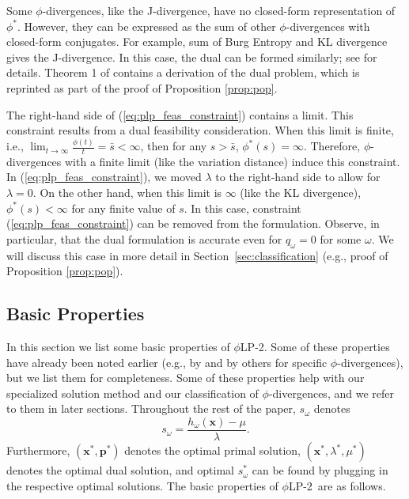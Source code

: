 \documentclass[opre,nonblindrev]{informs3} %
\newcommand{\x}{\mathbf{x}}
\newcommand{\p}{\mathbf{p}}
\newcommand{\plp}{$\phi$LP-2}
\begin{document}
Some $\phi$-divergences, like the J-divergence, have no closed-form representation of $\phi^*$. 
However, they can be expressed as the sum of other $\phi$-divergences with closed-form conjugates. 
For example, sum of Burg Entropy and KL divergence gives the J-divergence. 
In this case, the dual can be formed similarly; see \cite{bental2011robust} for details.
Theorem 1 of \cite{bental2011robust} contains a derivation of the dual problem, which is reprinted as part of the proof of Proposition \ref{prop:pop}.


The right-hand side of (\ref{eq:plp_feas_constraint}) contains a limit.
This constraint results from a dual feasibility consideration. 
When this limit is finite, i.e., $\lim_{t \rightarrow \infty} \frac{\phi(t)}{t}=  \bar{s}<\infty$, then for any $s> \bar{s}$, $\phi^*(s)=\infty$. 
Therefore, $\phi$-divergences with a finite limit (like the variation distance) induce this constraint.
In (\ref{eq:plp_feas_constraint}), we moved $\lambda$ to the right-hand side to allow for $\lambda=0$. 
On the other hand, when this limit is $\infty$ (like the KL divergence), $\phi^*(s)<\infty$ for any finite value of $s$. 
In this case, 
constraint (\ref{eq:plp_feas_constraint}) can be removed from the formulation. 
Observe, in particular, that the dual formulation is accurate even for $q_\omega = 0$ for some $\omega$.  
We will discuss this case in more detail in Section~\ref{sec:classification} (e.g., proof of  Proposition \ref{prop:pop}).



\subsection{Basic Properties}
\label{ssec:basicprop}

In this section we list some basic properties of \plp.
Some of these properties have already been noted earlier (e.g., by \citet{bental2011robust} and by others for specific $\phi$-divergences), but we list them for completeness.
Some of these properties help with our specialized solution method and our classification of $\phi$-divergences, and we refer to them in later sections.
Throughout the rest of the paper, $s_\omega$ denotes
\begin{equation*}
	s_\omega = \frac{h_\omega(\x) - \mu}{\lambda}. %
\end{equation*}
Furthermore, $(\x^*, \p^*)$ denotes the optimal primal solution, $(\x^*, \lambda^*, \mu^*)$ denotes the optimal dual solution, and optimal $s_\omega^*$ can be found by plugging in the respective optimal solutions. 
The basic properties of \plp\ are as follows.
\end{document}
